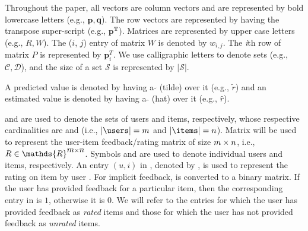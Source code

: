 \iffalse

Throughout the paper, all vectors are column vectors and are represented by
bold lowercase letters (e.g., $\bm{p,q}$). The row vectors are represented by
having the transpose super-script (e.g., $\bm{p^T}$). Matrices are represented by upper
case letters (e.g., ${R,W}$). The ($i$, $j$) entry of matrix $W$ is denoted by
$w_{i,j}$. The \textit{i}th row of matrix $P$ is represented by $\bm{p}_i^T$. We use calligraphic letters to denote sets (e.g.,
$\mathcal{C,D}$), and the size of a set $\mathcal{S}$ is represented by
$|\mathcal{S}|$. 
 
 
A predicted value is denoted by having a
$\mathbf{\tilde{}}$ (tilde) over it (e.g., $\tilde {r}$) and an estimated value
is denoted by having a $\mathbf{\hat{}}$ (hat) over it (e.g., $\hat {r}$).

\users and \items are used to denote the sets of users and items, respectively,
whose respective cardinalities are \nusers and \nitems (i.e., $|\users| =
\nusers$ and $|\items| = \nitems$). Matrix \rmat will be used to represent the
user-item feedback/rating matrix of size $\mbox{$m$} \times \mbox{$n$}$, i.e., $\rmat
\in \mathds{R}^{\nusers \times \nitems}$. Symbols \usru and \itmi are used to denote
individual users and items, respectively. An entry $(u, i)$ in \rmat, denoted by
\rui, is used to represent the rating on item \itmi by user \usru.
%
For implicit feedback, \rmat is converted to a binary matrix. If the user has
provided feedback for a particular item, then the corresponding entry in \rmat
is $1$, otherwise it is $0$. We will refer to the entries for which the user
has provided feedback as \emph{rated} items and those for which the user has
not provided feedback as \emph{unrated} items.

